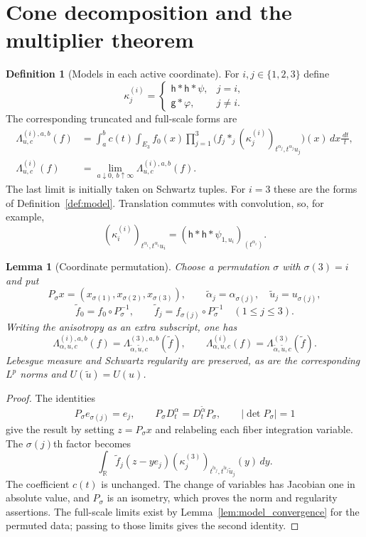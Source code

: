 \documentclass[12pt,reqno]{amsart}
\theoremstyle{plain}
\newtheorem{lemma}[theorem]{Lemma}
\theoremstyle{definition}
\newtheorem{definition}[theorem]{Definition}
\theoremstyle{remark}
\numberwithin{equation}{section}
\newcommand{\R}{\mathbb R}
\newcommand{\g}{\mathsf g}
\newcommand{\h}{\mathsf h}
\newcommand{\dd}{\,d}
\begin{document}
\section{Cone decomposition and the multiplier theorem}

\begin{definition}[Models in each active coordinate]\label{def:permuted_model}
For $i,j\in\{1,2,3\}$ define
\[
 \kappa_j^{(i)}=
 \begin{cases}
  \h*\h*\psi,&j=i,\\
  \g*\varphi,&j\ne i.
 \end{cases}
\]
The corresponding truncated and full-scale forms are
\begin{align*}
 \Lambda^{(i),a,b}_{u,c}(f)
 &=\int_a^b c(t)\int_{E_3}f_0(x)
       \prod_{j=1}^3
       \big(f_j*_j(\kappa_j^{(i)})_{t^{\alpha_j},t^{\alpha_j}u_j}\big)(x)
                                      \dd x\frac{\dd t}{t},\\
 \Lambda^{(i)}_{u,c}(f)
 &=\lim_{a\downarrow0,\ b\uparrow\infty}\Lambda^{(i),a,b}_{u,c}(f).
\end{align*}
The last limit is initially taken on Schwartz tuples.
For $i=3$ these are the forms of Definition~\ref{def:model}.
Translation commutes with convolution, so, for example,
\[
 (\kappa_i^{(i)})_{t^{\alpha_i},t^{\alpha_i}u_i}
      =(\h*\h*\psi_{1,u_i})_{(t^{\alpha_i})}.
\]
\end{definition}

\begin{lemma}[Coordinate permutation]\label{lem:permutation}
Choose a permutation $\sigma$ with $\sigma(3)=i$ and put
\[
 P_\sigma x=(x_{\sigma(1)},x_{\sigma(2)},x_{\sigma(3)}),\qquad
 \widetilde\alpha_j=\alpha_{\sigma(j)},\quad
 \widetilde u_j=u_{\sigma(j)},
\]
\[
 \widetilde f_0=f_0\circ P_\sigma^{-1},\qquad
 \widetilde f_j=f_{\sigma(j)}\circ P_\sigma^{-1}\quad(1\le j\le3).
\]
Writing the anisotropy as an extra subscript, one has
\[
 \Lambda^{(i),a,b}_{\alpha,u,c}(f)
      =\Lambda^{(3),a,b}_{\widetilde\alpha,\widetilde u,c}(\widetilde f),
 \qquad
 \Lambda^{(i)}_{\alpha,u,c}(f)
      =\Lambda^{(3)}_{\widetilde\alpha,\widetilde u,c}(\widetilde f).
\]
Lebesgue measure and Schwartz regularity are preserved, as are the
corresponding $L^p$ norms and $U(\widetilde u)=U(u)$.
\end{lemma}
\begin{proof}
The identities
\[
 P_\sigma e_{\sigma(j)}=e_j,\qquad
 P_\sigma D_t^\alpha=D_t^{\widetilde\alpha}P_\sigma,
 \qquad |\det P_\sigma|=1
\]
give the result by setting $z=P_\sigma x$ and relabeling each fiber
integration variable. The $\sigma(j)$th factor becomes
\[
 \int_\R\widetilde f_j(z-ye_j)
     (\kappa_j^{(3)})_{t^{\widetilde\alpha_j},
                                 t^{\widetilde\alpha_j}\widetilde u_j}(y)\dd y.
\]
The coefficient $c(t)$ is unchanged. The change of variables has
Jacobian one in absolute value, and $P_\sigma$ is an isometry, which
proves the norm and regularity assertions. The full-scale limits
exist by Lemma~\ref{lem:model_convergence} for the permuted data;
passing to those limits gives the second identity.
\end{proof}
\end{document}
